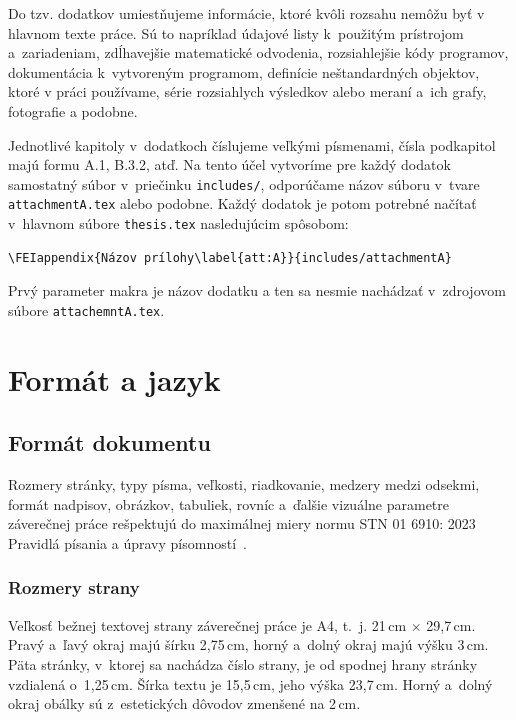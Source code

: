 Do tzv. dodatkov umiestňujeme informácie,
ktoré kvôli rozsahu nemôžu byť v hlavnom texte práce.
Sú to napríklad údajové listy k~použitým prístrojom
a~zariadeniam, zdĺhavejšie matematické odvodenia,
rozsiahlejšie kódy programov, dokumentácia
k~vytvoreným programom, definície neštandardných objektov,
ktoré v práci používame,
série rozsiahlych výsledkov alebo meraní
a~ich grafy, fotografie a podobne.

Jednotlivé kapitoly v~dodatkoch číslujeme veľkými písmenami, čísla podkapitol majú formu A.1, B.3.2, atď.
Na tento účel vytvoríme pre každý dodatok samostatný súbor v~priečinku \verb|includes/|, odporúčame názov súboru v~tvare \verb|attachmentA.tex| alebo podobne.
Každý dodatok je potom potrebné načítať v~hlavnom súbore \verb|thesis.tex| nasledujúcim spôsobom:
\begin{verbatim}
\FEIappendix{Názov prílohy\label{att:A}}{includes/attachmentA}
\end{verbatim}
Prvý parameter makra je názov dodatku a ten sa nesmie nachádzať v~zdrojovom súbore \verb|attachemntA.tex|.

\section{Formát a jazyk}\label{sec:formatLanguage}
\subsection{Formát dokumentu}
Rozmery stránky, typy písma, veľkosti, riadkovanie,
medzery medzi odsekmi, formát nadpisov, obrázkov, tabuliek,
rovníc a~ďalšie vizuálne parametre záverečnej práce
rešpektujú do maximálnej miery normu STN 01 6910: 2023
Pravidlá písania a úpravy písomností~\cite{stn016910}.

\subsubsection*{Rozmery strany}
Veľkosť bežnej textovej strany záverečnej práce je A4,
t.~j. 21\,cm $\times$ 29,7\,cm.
Pravý a~ľavý okraj majú šírku 2,75\,cm,
horný a~dolný okraj majú výšku 3\,cm.
Päta stránky, v~ktorej sa nachádza číslo strany,
je od spodnej hrany stránky vzdialená o~1,25\,cm.
Šírka textu je 15,5\,cm, jeho výška 23,7\,cm.
Horný a~dolný okraj obálky sú z~estetických
dôvodov zmenšené na 2\,cm.

